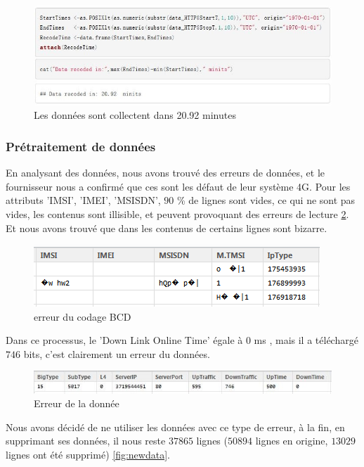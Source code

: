       
      \begin{figure}[H]
\centering
\includegraphics[width=15Cm]{images/lasttime}
\caption{Les données sont collectent dans 20.92 minutes}
\label{fig:lasttime}
\end{figure}

\subsubsection{Prétraitement de données}
En analysant des données, nous avons trouvé des erreurs de données, et le fournisseur nous a confirmé que ces sont les défaut de leur système 4G. Pour les attributs 'IMSI', 'IMEI', 'MSISDN', $90$ \% de lignes sont vides, ce qui ne sont pas vides, les contenus sont illisible, et peuvent provoquant des erreurs de lecture \ref{fig:errorData}. Et nous avons trouvé que dans les contenus de certains lignes sont bizarre. 
\begin{figure}[H]
	\centering
	\includegraphics[width=0.7\linewidth]{images/errorData}
	\caption{erreur du codage BCD}
	\label{fig:errorData}
\end{figure}
Dans ce processus, le 'Down Link Online Time' égale à  $0$ ms , mais il a téléchargé $746$ bits, c'est clairement un erreur du données.
\begin{figure}[H]
	\centering
	\includegraphics[width=0.9\linewidth]{images/bizarre}
	\caption{Erreur de la donnée}
	\label{fig:bizarre}
\end{figure}

 Nous avons décidé de ne utiliser les données avec ce type de erreur, à la fin, en supprimant ses données, il nous reste $37865$ lignes ($50894$ lignes en origine, $13029$ lignes ont été supprimé)  \ref{fig:newdata}.
 
